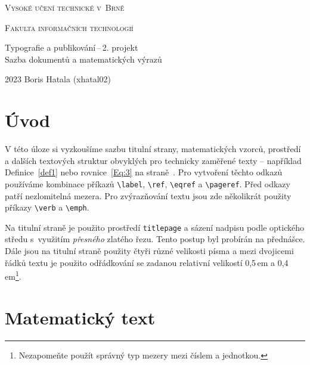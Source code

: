 \documentclass[11pt, a4paper, twocolumn]{article}
\begin{document}
\begin{titlepage}
\thispagestyle{empty}

    \begin{center}

        {\Huge \textsc{Vysoké učení technické v~Brně \\[0.5em]}}

        {\huge \textsc{Fakulta informačních technologií}}


        {\LARGE Typografie a publikování\,--\,2. projekt \\[0.4em] 
        Sazba dokumentů a matematických výrazů }


    \end{center}
{\Large 2023 \hfill Boris Hatala (xhatal02)}

\end{titlepage}

\newpage
\setcounter{page}{1}

\section*{Úvod}\label{Page:1}
V této úloze si vyzkoušíme sazbu titulní strany, matematických vzorců, 
prostředí a dalších textových struktur obvyklých pro technicky zaměřené texty -- například
Definice~\ref{def1} nebo rovnice~\eqref{Eq:3} na straně~\pageref{Page:1}. Pro vytvoření těchto odkazů používáme 
kombinace příkazů \verb|\label|, \verb|\ref|, \verb|\eqref| a \verb|\pageref|. 
Před odkazy patří nezlomitelná mezera. Pro zvýrazňování textu jsou zde několikrát
použity příkazy \verb|\verb| a \verb|\emph|.\par
Na titulní straně je použito prostředí \texttt{titlepage} a sázení nadpisu podle 
optického středu s~využitím \textit{přesného} zlatého řezu. 
Tento postup byl probírán na přednášce. Dále jsou na titulní straně použity
čtyři různé velikosti písma a mezi dvojicemi řádků textu je použito 
odřádkování se zadanou relativní velikostí 0,5\,em a 
0,4\,em\footnote[1]{Nezapomeňte použít správný typ mezery mezi číslem a jednotkou.}. 

\section{Matematický text}
\end{document}
